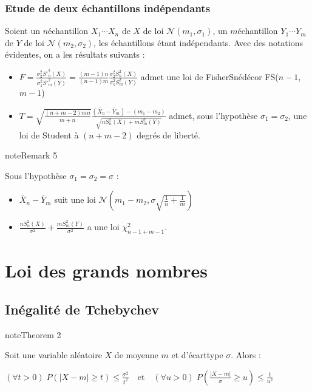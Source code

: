 \documentclass[letterpaper,10pt,english]{jupyterBook}
\begin{document}
\subsubsection{Etude de deux échantillons indépendants}
\label{\detokenize{elemstats:etude-de-deux-echantillons-independants}}
\sphinxAtStartPar
Soient un \(n\)\sphinxhyphen{}échantillon \(X_1\cdots X_n\) de \(X\) de loi \(\mathcal{N}(m_1,\sigma_1)\), un \(m\)\sphinxhyphen{}échantillon \(Y_1\cdots Y_m\) de \(Y\) de loi \(\mathcal{N}(m_2,\sigma_2)\), les échantillons étant indépendants. Avec des notations évidentes, on a les résultats suivants :
\begin{itemize}
\item {} 
\sphinxAtStartPar
\(F = \frac{\sigma_2^2 S'^2_n(X)}{\sigma_1^2 S'^2_m(Y)} = \frac{(m-1)n}{(n-1)m}\frac{\sigma_2^2S_n^2(X)}{\sigma_1^2S_m^2(Y)}\) admet une loi de Fisher\sphinxhyphen{}Snédécor FS(\(n-1\),\(m-1\))

\item {} 
\sphinxAtStartPar
\(T = \sqrt{\frac{(n+m-2)mn}{m+n}}\frac{(\bar{X}_n-\bar{Y}_m)-(m_1-m_2)}{\sqrt{nS_n^2(X)+mS_m^2(Y)}}\) admet, sous l’hypothèse \(\sigma_1=\sigma_2\), une loi de Student à \((n+m-2)\) degrés de liberté.

\end{itemize}
\label{elemstats:remark-3}
\begin{sphinxadmonition}{note}{Remark 5}



\sphinxAtStartPar
Sous l’hypothèse \(\sigma_1=\sigma_2=\sigma\) :
\begin{itemize}
\item {} 
\sphinxAtStartPar
\(\bar{X}_n-\bar{Y}_m\) suit une loi \(\mathcal{N}(m_1-m_2,\sigma\sqrt{\frac1n+\frac1m})\)

\item {} 
\sphinxAtStartPar
\(\frac{nS_n^2(X)}{\sigma^2}+\frac{mS_m^2(Y)}{\sigma^2}\) a une loi \(\chi^2_{n-1+m-1}\).

\end{itemize}
\end{sphinxadmonition}


\section{Loi des grands nombres}
\label{\detokenize{elemstats:loi-des-grands-nombres}}

\subsection{Inégalité de Tchebychev}
\label{\detokenize{elemstats:inegalite-de-tchebychev}}\label{elemstats:theorem-4}
\begin{sphinxadmonition}{note}{Theorem 2}



\sphinxAtStartPar
Soit une variable aléatoire \(X\) de moyenne \(m\) et d’écart\sphinxhyphen{}type \(\sigma\). Alors :

\sphinxAtStartPar
\((\forall t>0)\; P(|X-m|\geq t)\leq \frac{\sigma^2}{t^2}\quad\textrm{et}\quad (\forall u>0)\; P(\frac{|X-m|}{\sigma}\geq u)\leq \frac{1}{u^2}\)
\end{sphinxadmonition}
\end{document}
